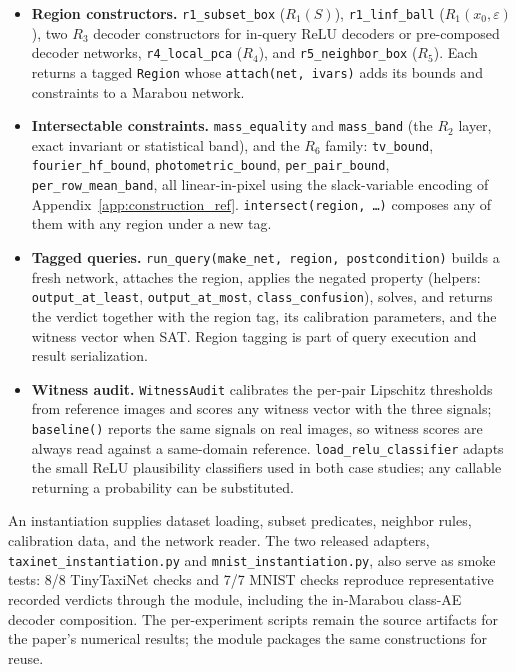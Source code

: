 \documentclass[twocolumn,smallextended,runningheads]{svjour3}
\begin{document}
\begin{itemize}[nosep]
  \item \textbf{Region constructors.} \texttt{r1\_subset\_box} ($R_1(S)$), \texttt{r1\_linf\_ball} ($R_1(x_0,\varepsilon)$), two $R_3$ decoder constructors for in-query ReLU decoders or pre-composed decoder networks, \texttt{r4\_local\_pca} ($R_4$), and \texttt{r5\_neighbor\_box} ($R_5$). Each returns a tagged \texttt{Region} whose \texttt{attach(net, ivars)} adds its bounds and constraints to a Marabou network.
  \item \textbf{Intersectable constraints.} \texttt{mass\_equality} and \texttt{mass\_band} (the $R_2$ layer, exact invariant or statistical band), and the $R_6$ family: \texttt{tv\_bound}, \texttt{fourier\_hf\_bound}, \texttt{photometric\_bound}, \texttt{per\_pair\_bound}, \texttt{per\_row\_mean\_band}, all linear-in-pixel using the slack-variable encoding of Appendix~\ref{app:construction_ref}. \texttt{intersect(region, \ldots)} composes any of them with any region under a new tag.
  \item \textbf{Tagged queries.} \texttt{run\_query(make\_net, region, postcondition)} builds a fresh network, attaches the region, applies the negated property (helpers: \texttt{output\_at\_least}, \texttt{output\_at\_most}, \texttt{class\_confusion}), solves, and returns the verdict together with the region tag, its calibration parameters, and the witness vector when SAT. Region tagging is part of query execution and result serialization.
  \item \textbf{Witness audit.} \texttt{WitnessAudit} calibrates the per-pair Lipschitz thresholds from reference images and scores any witness vector with the three signals; \texttt{baseline()} reports the same signals on real images, so witness scores are always read against a same-domain reference. \texttt{load\_relu\_classifier} adapts the small ReLU plausibility classifiers used in both case studies; any callable returning a probability can be substituted.
\end{itemize}

An instantiation supplies dataset loading, subset predicates, neighbor rules, calibration data, and the network reader. The two released adapters, \texttt{taxinet\_instantiation.py} and \texttt{mnist\_instantiation.py}, also serve as smoke tests: 8/8 TinyTaxiNet checks and 7/7 MNIST checks reproduce representative recorded verdicts through the module, including the in-Marabou class-AE decoder composition. The per-experiment scripts remain the source artifacts for the paper's numerical results; the module packages the same constructions for reuse.
\end{document}
